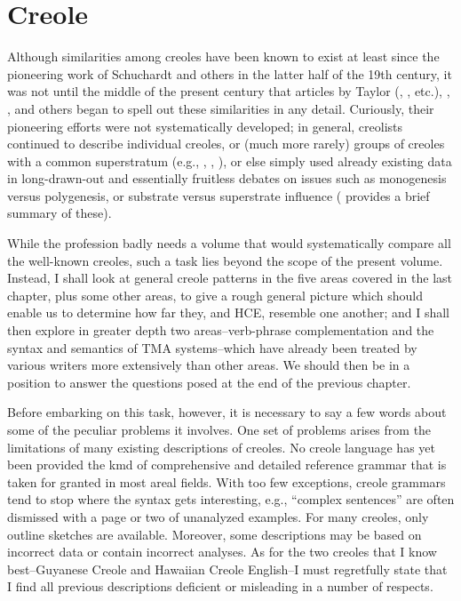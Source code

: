 \chapter{Creole} \label{ch:2}

Although similarities among creoles have been known to exist at least since the pioneering work of Schuchardt and others in the latter half of the 19th century, it was not until the middle of the present century that articles by Taylor (\citeyear{Taylor1960}, \citeyear{Taylor1963}, etc.), \citet{Thompson1961}, \citet{Whinnom1956, Whinnom1965}, and others began to spell out these similarities in any detail. Curiously, their pioneering efforts were not systematically developed; in general, creolists continued to describe individual creoles, or (much more rarely) groups of creoles with a common superstratum (e.g., \citealt{Goodman1964}, \citealt{Hancock1970}, \citealt{Alleyne1980}), or else simply used already existing data in long-drawn-out and essentially fruitless debates on issues such as monogenesis versus poly\-genesis, or substrate versus superstrate influence (\citealt{Bickerton1976} provides a brief summary of these).

While the profession badly needs a volume that would systematically compare all the well-known creoles, such a task lies beyond the scope of the present volume. Instead, I shall look at general creole patterns in the five areas covered in the last chapter, plus some other areas, to give a rough general picture which should enable us to deter\-mine how far they, and HCE, resemble one another; and I shall then
explore in greater depth two areas--verb-phrase complementation and the syntax and semantics of TMA systems--which have already been treated by various writers more extensively than other areas. We should then be in a position to answer the questions posed at the end of the previous chapter. 

Before embarking on this task, however, it is necessary to say a few words about some of the peculiar problems it involves. One set of problems arises from the limitations of many existing descriptions of creoles. No creole language has yet been provided the kmd of com\-prehensive and detailed reference grammar that is taken for granted in most areal fields. With too few exceptions, creole grammars tend to stop where the syntax gets interesting, e.g., ``complex sentences'' are often dismissed with a page or two of unanalyzed examples. For many creoles, only outline sketches are available. Moreover, some descriptions may be based on incorrect data or contain incorrect analyses. As for the two creoles that I know best--Guyanese Creole and Hawaiian Creole English--I must regretfully state that I find all previous descriptions deficient or misleading in a number of respects.

